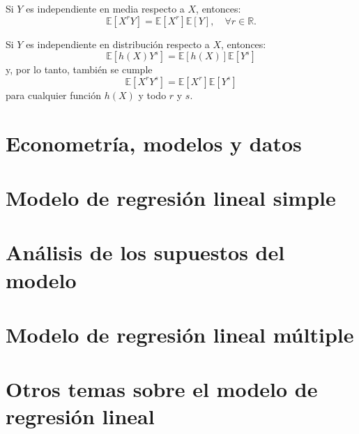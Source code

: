 \documentclass[8pt,a4paper]{extarticle}
\begin{document}
\begin{multicols}{3}
\begin{boxprop}[]
	Si $Y$ es independiente en media respecto a $X$, entonces:
	\[
		\mathbb{E}[X^r Y] = \mathbb{E}[X^r] \mathbb{E}[Y], \quad \forall r\in \mathbb{R}
	.\] 
\end{boxprop}

\begin{boxprop}[]
	Si $Y$ es independiente en distribución respecto a $X$, entonces:
	\[
		\mathbb{E}[h(X) Y^s] = \mathbb{E}[h(X)] \mathbb{E}[Y^s]
	\] 
	y, por lo tanto, también se cumple
	\[
		\mathbb{E}[X^r Y^s] = \mathbb{E}[X^r] \mathbb{E}[Y^s]
	\] 
	para cualquier función $h(X)$ y todo $r$ y $s$.
\end{boxprop}

\newpage
\section{Econometría, modelos y datos}

\newpage
\section{Modelo de regresión lineal simple}

\newpage
\section{Análisis de los supuestos del modelo}

\newpage
\section{Modelo de regresión lineal múltiple}

\newpage
\section{Otros temas sobre el modelo de regresión lineal}

\vfill\eject
\columnbreak
\end{multicols}
\end{document}
